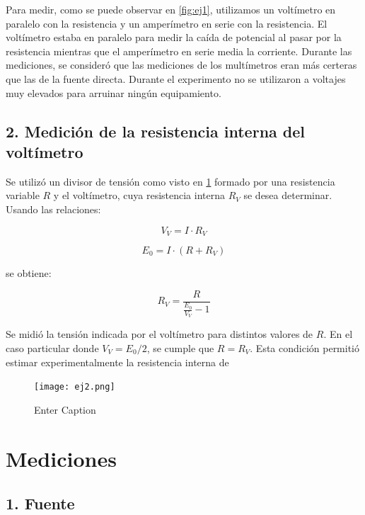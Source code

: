 \documentclass[11pt]{article}
\begin{document}
Para medir, como se puede observar en \ref{fig:ej1}, utilizamos un voltímetro en paralelo con la resistencia y un amperímetro en serie con la resistencia. El voltímetro estaba en paralelo para medir la caída de potencial al pasar por la resistencia mientras que el amperímetro en serie media la corriente. Durante las mediciones, se consideró que las mediciones de los multímetros eran más certeras que las de la fuente directa. Durante el experimento no se utilizaron a voltajes muy elevados para arruinar ningún equipamiento. 

\subsection*{2. Medición de la resistencia interna del voltímetro}
Se utilizó un divisor de tensión como visto en \ref{fig:ej2} formado por una resistencia variable \( R \) y el voltímetro, cuya resistencia interna \( R_V \) se desea determinar. Usando las relaciones:

\begin{equation}
    V_V = I \cdot R_V
    \label{eq:voltimetro}
\end{equation}

\begin{equation}
    E_0 = I \cdot (R + R_V)
    \label{eq:fuente}
\end{equation}

se obtiene:

\begin{equation}
    R_V = \frac{R}{\frac{E_0}{V_V} - 1}
    \label{eq:resistencia-interna}
\end{equation}

Se midió la tensión indicada por el voltímetro para distintos valores de \( R \). En el caso particular donde \( V_V = E_0 / 2 \), se cumple que \( R = R_V \). Esta condición permitió estimar experimentalmente la resistencia interna de
\begin{figure}[H]
    \centering
    \texttt{[image: ej2.png]}
    \caption{Enter Caption}
    \label{fig:ej2}
\end{figure}

\section*{Mediciones}

\subsection*{1. Fuente}
\end{document}

